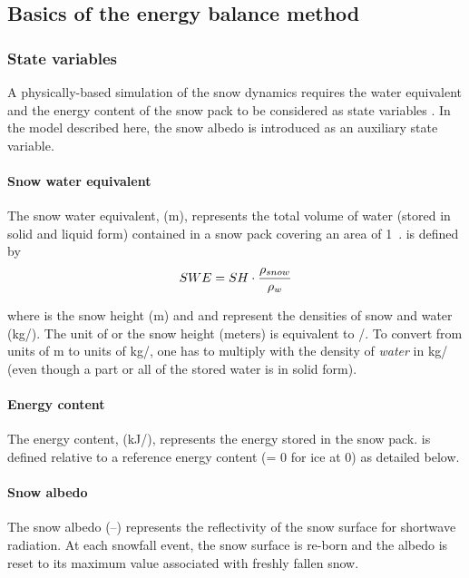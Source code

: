 \subsection{Basics of the energy balance method} \label{sec:snow-enBal_basics}

\subsubsection{State variables}
A physically-based simulation of the snow dynamics requires the water equivalent and the energy content of the snow pack to be considered as state variables \citep[\eg][]{Dyck1995,Tarboton1996}. In the model described here, the snow albedo is introduced as an auxiliary state variable.

\paragraph{Snow water equivalent} The snow water equivalent, \snowWaterEquivalent{} (m), represents the total volume of water (stored in solid and liquid form) contained in a snow pack covering an area of 1~\sqm. \snowWaterEquivalent{} is defined by 
\begin{equation} \label{eqn:snow-enBal_defSWE}
	SWE = SH \cdot \frac{\rho_{snow}}{\rho_{w}}
\end{equation}
  
where \snowHeight{} is the snow height (m) and \densitySnow{} and \densityWater{} represent the densities of snow and water (kg/\cbm{}). The unit of \snowWaterEquivalent{} or the snow height (meters) is equivalent to \cbm/\sqm. To convert from units of m to units of kg/\sqm{}, one has to multiply \snowWaterEquivalent{} with the density of \emph{water} \densityWater{} in kg/\cbm{} (even though a part or all of the stored water is in solid form).

\paragraph{Energy content} The energy content, \snowEnergyContent{} (kJ/\sqm{}), represents the energy stored in the snow pack. \snowEnergyContent{} is defined relative to a reference energy content (\snowEnergyContent= 0 for ice at 0\celsius) as detailed below.

\paragraph{Snow albedo} The snow albedo \snowAlbedo{} (--) represents the reflectivity of the snow surface for shortwave radiation. At each snowfall event, the snow surface is re-born and the albedo is reset to its maximum value associated with freshly fallen snow.

